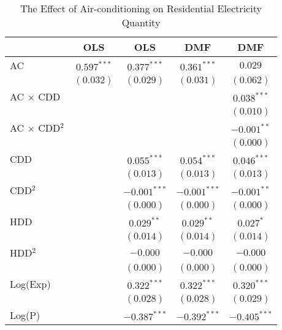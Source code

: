 
\begin{table}[htbp]
\caption{The Effect of Air-conditioning on Residential Electricity Quantity}
\begin{center}
\begin{tabular}{l c c c c}
\hline
 & OLS & OLS & DMF & DMF \\
\hline
AC                        & $0.597^{***}$ & $0.377^{***}$  & $0.361^{***}$  & $0.029$        \\
                          & $(0.032)$     & $(0.029)$      & $(0.031)$      & $(0.062)$      \\
AC $\times$ CDD           &               &                &                & $0.038^{***}$  \\
                          &               &                &                & $(0.010)$      \\
AC $\times$ CDD$^2$       &               &                &                & $-0.001^{**}$  \\
                          &               &                &                & $(0.000)$      \\
CDD                       &               & $0.055^{***}$  & $0.054^{***}$  & $0.046^{***}$  \\
                          &               & $(0.013)$      & $(0.013)$      & $(0.013)$      \\
CDD$^2$                   &               & $-0.001^{***}$ & $-0.001^{***}$ & $-0.001^{**}$  \\
                          &               & $(0.000)$      & $(0.000)$      & $(0.000)$      \\
HDD                       &               & $0.029^{**}$   & $0.029^{**}$   & $0.027^{*}$    \\
                          &               & $(0.014)$      & $(0.014)$      & $(0.014)$      \\
HDD$^2$                   &               & $-0.000$       & $-0.000$       & $-0.000$       \\
                          &               & $(0.000)$      & $(0.000)$      & $(0.000)$      \\
Log(Exp)                  &               & $0.322^{***}$  & $0.322^{***}$  & $0.320^{***}$  \\
                          &               & $(0.028)$      & $(0.028)$      & $(0.029)$      \\
Log(P)                    &               & $-0.387^{***}$ & $-0.392^{***}$ & $-0.405^{***}$ \\

\end{tabular}
\end{center}
\end{table}
